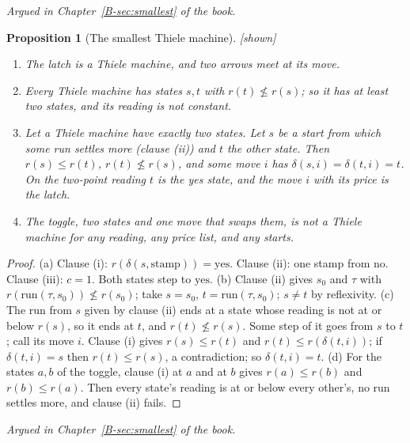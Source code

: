 \documentclass[11pt, a4paper]{article}
\theoremstyle{plain}
\newtheorem{proposition}[theorem]{Proposition}
\theoremstyle{definition}
\theoremstyle{remark}
\newcommand{\step}{\delta}
\newcommand{\cost}{c}
\newcommand{\rd}{r}
\newcommand{\run}{\mathrm{run}}
\newcommand{\argued}[1]{\par\noindent\textit{Argued in Chapter~\ref{B-#1} of the book.}\par}
\newcommand{\kind}[1]{\textup{[#1]}}
\begin{document}
\argued{sec:smallest}

\begin{proposition}[The smallest Thiele machine]\label{spec:smallest} \kind{shown}
\begin{enumerate}[label=(\alph*)]
\item The latch is a Thiele machine, and two arrows meet at its move.
\item Every Thiele machine has states $s,t$ with $\rd(t)\not\le\rd(s)$; so it has at least two states,
and its reading is not constant.
\item Let a Thiele machine have exactly two states. Let $s$ be a start from which some run settles more
(clause (ii)) and $t$ the other state. Then $\rd(s)\le\rd(t)$, $\rd(t)\not\le\rd(s)$, and some move $i$
has $\step(s,i)=\step(t,i)=t$. On the two-point reading $t$ is the yes state, and the move $i$ with its
price is the latch.
\item The toggle, two states and one move that swaps them, is not a Thiele machine for any reading, any
price list, and any starts.
\end{enumerate}
\end{proposition}

\begin{proof}
(a) Clause (i): $\rd(\step(s,\mathrm{stamp}))=\mathrm{yes}$. Clause (ii): one stamp from $\mathrm{no}$.
Clause (iii): $\cost=1$. Both states step to $\mathrm{yes}$. (b) Clause (ii) gives $s_0$ and $\tau$ with
$\rd(\run(\tau,s_0))\not\le\rd(s_0)$; take $s=s_0$, $t=\run(\tau,s_0)$; $s\ne t$ by reflexivity.
(c) The run from $s$ given by clause (ii) ends at a state whose reading is not at or below $\rd(s)$, so
it ends at $t$, and $\rd(t)\not\le\rd(s)$. Some step of it goes from $s$ to $t$; call its move $i$.
Clause (i) gives $\rd(s)\le\rd(t)$ and
$\rd(t)\le\rd(\step(t,i))$; if $\step(t,i)=s$ then $\rd(t)\le\rd(s)$, a contradiction; so
$\step(t,i)=t$. (d) For the states $a,b$ of the toggle, clause (i) at $a$ and at $b$ gives
$\rd(a)\le\rd(b)$ and $\rd(b)\le\rd(a)$. Then every state's reading is at or below every other's, no run
settles more, and clause (ii) fails.
\end{proof}

\argued{sec:smallest}
\end{document}
